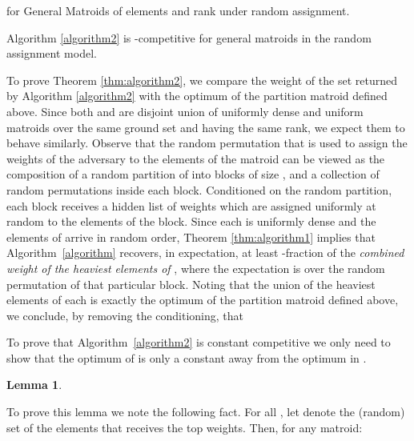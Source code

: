 \documentclass[letterpaper,11pt]{article}
\newtheorem{lem}[thm]{Lemma}
\theoremstyle{definition}
\theoremstyle{remark}
\begin{document}
\begin{algorithm}[h!!!!!]
\caption{for General Matroids of  elements and rank  under random assignment.}
\label{algorithm2}
\begin{algorithmic}[1]
\end{algorithmic}
\end{algorithm}

\begin{thm}\label{thm:algorithm2}
Algorithm \ref{algorithm2} is -competitive for general matroids in the random assignment model.
\end{thm}

To prove Theorem \ref{thm:algorithm2}, we compare the weight of the set  returned by Algorithm \ref{algorithm2} with the optimum of the partition matroid  defined above. Since both  and  are disjoint union of uniformly dense and uniform matroids over the same ground set and having the same rank, we expect them to behave similarly.
Observe that the random permutation  that is used to assign the weights of the adversary to the elements of the matroid can be viewed as the composition of a random partition of  into blocks of size , and a collection of random permutations inside each block. Conditioned on the random partition, each block  receives a hidden list of weights which are assigned uniformly at random to the elements of the block. Since each  is uniformly dense and the elements of  arrive in random order, Theorem \ref{thm:algorithm1} implies that Algorithm~\ref{algorithm} recovers, in expectation, at least -fraction of the \emph{combined weight of the heaviest  elements of }, where the expectation is over the random permutation of that particular block. Noting that the union of the heaviest  elements of each  is exactly the optimum of the partition matroid  defined above, we conclude, by removing the conditioning, that


To prove that Algorithm~\ref{algorithm2} is constant competitive we only need to show that the optimum of  is only a constant away from the optimum in .

\begin{lem}\label{lem:ineq2} 
\end{lem}

To prove this lemma we note the following fact. For all , let  denote the (random) set of the elements that receives the top  weights. Then, for any matroid:
\end{document}
